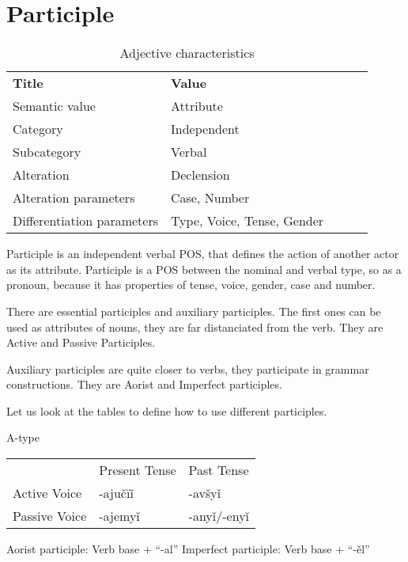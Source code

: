 \section{Participle}

\begin{table}[h]
	\caption{Adjective characteristics}
	\begin{tabular}{lllll}
		\textbf{Title}              & \textbf{Value}               \\
		Semantic value              & Attribute                    \\
		Category                    & Independent                  \\
		Subcategory                 & Verbal                       \\
		Alteration                  & Declension                   \\
		Alteration parameters       & Case, Number                 \\
		Differentiation parameters  & Type, Voice, Tense, Gender
	\end{tabular}
\end{table}

Participle is an independent verbal POS, that defines the action of another actor as its attribute. Participle is a POS between the nominal and verbal type, so as a pronoun, because it has properties of tense, voice, gender, case and number.

There are essential participles and auxiliary participles. The first ones can be used as attributes of nouns, they are far distanciated from the verb. They are Active and Passive Participles.

Auxiliary participles are quite closer to verbs, they participate in grammar constructions. They are Aorist and Imperfect participles.

Let us look at the tables to define how to use different participles.

A-type

\begin{table}
	\begin{tabular}{lll}
		& Present Tense & Past Tense \\
		 Active Voice & -ajučïǐ & -avšyǐ \\
		 Passive Voice & -ajemyǐ & -anyǐ/-enyǐ
	\end{tabular}
\end{table}

Aorist participle: Verb base + “-al”
Imperfect participle: Verb base + “-ěl”

